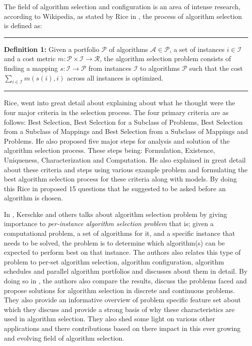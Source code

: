 The field of algorithm selection and configuration is an area of intense research, according to Wikipedia, as stated by Rice in \citep{rice197665}, the process of algorithm selection is defined as:

\par\noindent\rule{\textwidth}{0.4pt}\newline
\textbf{Definition 1:} Given a portfolio ${\displaystyle{\mathcal{P}}}$ of algorithms ${\displaystyle{\mathcal{A}} \in {\mathcal{P}}}$, a set of instances ${\displaystyle{i \in {\mathcal{I}}}}$ and a cost metric ${\displaystyle{m:{\mathcal{P}} \times {\mathcal{I}} \to \mathcal{R}}}$, the algorithm selection problem consists of finding a mapping ${\displaystyle s:{\mathcal {I}}\to {\mathcal {P}}}$ from instances ${\displaystyle {\mathcal {I}}}$ to algorithms ${\displaystyle {\mathcal {P}}}$ such that the cost ${\displaystyle \sum _{i\in {\mathcal {I}}}m(s(i),i)}$ across all instances is optimized.
\par\noindent\rule{\textwidth}{0.4pt}

Rice, went into great detail about explaining about what he thought were the four major criteria in the selection process. The four primary criteria are as follows: Best Selection, Best Selection for a Subclass of Problems, Best Selection from a Subclass of Mappings and Best Selection from a Subclass of Mappings and Problems. He also proposed five major steps for analysis and solution of the algorithm selection process. These steps being: Formulation, Existence, Uniqueness, Characterization and Computation. He also explained in great detail about these criteria and steps using various example problem and formulating the best algorithm selection process for these criteria along with models. By doing this Rice in \citep{rice197665} proposed 15 questions that he suggested to be asked before an algorithm is chosen.

In \citep{kerschke2018automated}, Kerschke and others talks about algorithm selection problem by giving importance to \textit{per-instance algorithm selection problem} that is; given a computational problem, a set of algorithms for it, and a specific instance that needs to be solved, the problem is to determine which algorithm(s) can be expected to perform best on that instance. The authors also relates this type of problem to per-set algorithm selection, algorithm configuration, algorithm schedules and parallel algorithm portfolios and discusses about them in detail. By doing so in \citep{kerschke2018automated}, the authors also compare the results, discuss the problems faced and propose solutions for algorithm selection in discrete and continuous problems. They also provide an informative overview of problem specific feature set about which they discuss and provide a strong basis of why these characteristics are used in algorithm selection. They also shed some light on various other applications and there contributions based on there impact in this ever growing and evolving field of algorithm selection.

